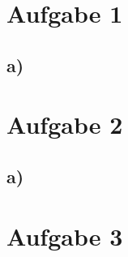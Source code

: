 \newcommand{\NUMBER}{2}
\newcommand{\EXERCISES}{3}
\newcommand{\DEADLINE}{01.01.1970 12am}
\newcommand{\COURSE}{Vorlesung xyz}
\newcommand{\TUTOR}{Tina Tutor}
\newcommand{\STUDENTA}{Ioannis Nezis 12345678}
\newcommand{\STUDENTB}{Max Mustermensch 87423423}


\usepackage{pgfplots}
\tikzexternalize

\toppage

\section*{Aufgabe 1}
\subsection*{a)}
\newpage

\section*{Aufgabe 2}
\subsection*{a)}
\section*{Aufgabe 3}


